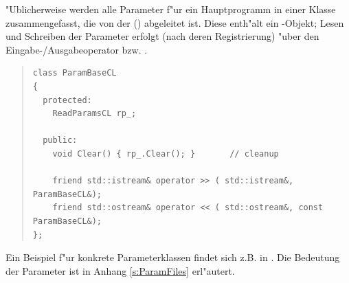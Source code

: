 \documentclass[11pt,a4paper]{article}
\newenvironment{Code}{\begin{quote}\scriptsize}{\end{quote}}
\begin{document}
"Ublicherweise werden alle Parameter f"ur ein Hauptprogramm in einer Klasse
zusammengefasst, die von der  () abgeleitet
ist. Diese enth"alt ein -Objekt; Lesen und Schreiben der
Parameter erfolgt (nach deren Registrierung) "uber den Eingabe-/Ausgabeoperator 
\prg{>>} bzw. \prg{<<}.
\begin{Code}
\begin{verbatim}
class ParamBaseCL
{
  protected:
    ReadParamsCL rp_;
    
  public:
    void Clear() { rp_.Clear(); }		// cleanup

    friend std::istream& operator >> ( std::istream&, ParamBaseCL&);
    friend std::ostream& operator << ( std::ostream&, const ParamBaseCL&);
};
\end{verbatim}
\end{Code}
Ein Beispiel f"ur konkrete Parameterklassen findet sich z.B. in 
. Die Bedeutung der Parameter ist in Anhang
\ref{s:ParamFiles} 
erl"autert.


				\appendix


\end{document}
